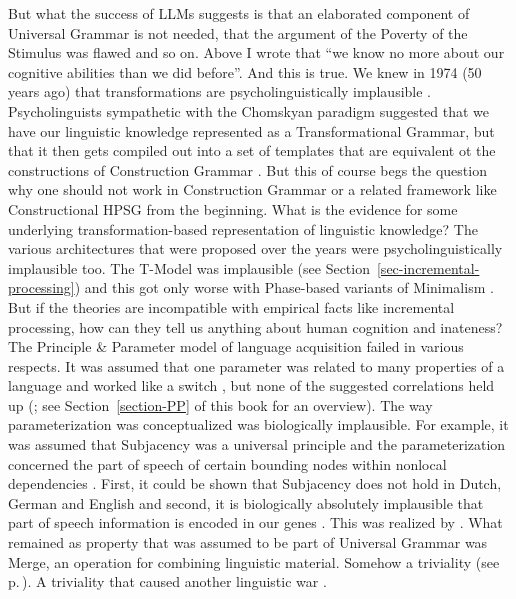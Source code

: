 But what the success of LLMs suggests is that an elaborated component of Universal
Grammar is not needed, that the argument of the Poverty of the Stimulus was flawed and so on. Above
I wrote that ``we know no more about our cognitive abilities than we did before''. And this is
true. We knew in 1974 (50 years ago) that transformations are psycholinguistically
implausible \citep*[--328]{FBG74a-u}. Psycholinguists sympathetic with the Chomskyan paradigm suggested that we have our
linguistic knowledge represented as a Transformational Grammar, but that it then gets compiled out
into a set of templates that are equivalent ot the constructions of Construction Grammar \citep[]{FC96a-u}. But this
of course begs the question why one should not work in Construction Grammar or a related framework
like Constructional HPSG \citep{Sag97a,HPSGHandbook} from the beginning. What
is the evidence for some underlying transformation-based representation of linguistic knowledge? The
various architectures that were proposed over the years were psycholinguistically implausible
too. The T-Model \citep{Chomsky81a,Chomsky86b} was implausible (see Section~\ref{sec-incremental-processing}) and this got only worse with
Phase-based variants of Minimalism \parencites{Chomsky95a-u,Chomsky2008a}[,
830]{Richards2015a}[Section~5]{BM2021a}. But if the theories are incompatible with 
empirical facts like incremental processing, how can they tell us anything about human cognition and
inateness? 
The Principle \& Parameter model of language acquisition \citep[]{Chomsky81a}
failed in various respects. It was assumed that one parameter was related to many properties of a
language and worked like a switch \parencites{Rizzi86a}[]{Chomsky2000a-u},
 but none of the suggested correlations held up (\cites{Haider94c-u}[Section~2.2]{Haider2001a}; see
 Section~\ref{section-PP} of this book for an overview).
The way
parameterization was conceptualized was biologically implausible. For example, it was assumed that
Subjacency was a universal principle and the parameterization concerned the part of speech of
certain bounding nodes within nonlocal dependencies \parencites[]{Chomsky73a}[]{Chomsky86b}{Baltin81a,Baltin2006a}.
First, it could be shown that Subjacency does not hold in
Dutch, German and English \parencites[]{Koster78b-u}[]{Mueller99a}{Mueller2004d}[Section~3]{Mueller2007c}{SS2013b-u} and second, it is biologically
absolutely implausible that part of speech information is encoded in our genes \parencites{Bishop2002a}[Section~6.4.2.2]{Dabrowska2004a}{FM2005a}.
This was realized by
\citet*{HCF2002a}. What remained as property that was assumed to be part of Universal Grammar was
Merge, an operation for combining linguistic material. Somehow a triviality (see
p.\,\pageref{ex-n-ary-merge}). A triviality that caused another linguistic war \citep{Pullum2024a}.\nocite{Harris93a}
 
